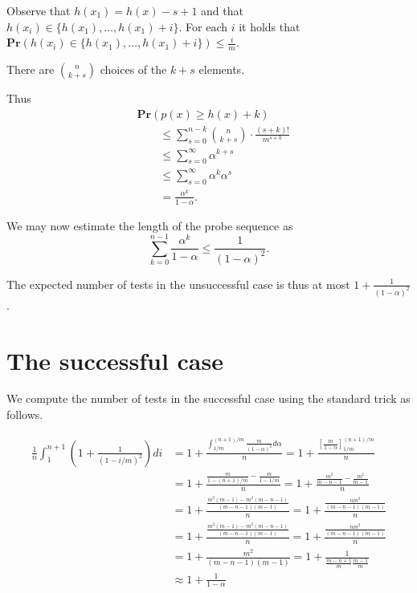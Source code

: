 \documentclass[12pt,notitlepage]{report}
\theoremstyle{definition}
\theoremstyle{plain}
\newcommand{\Prob}[1]{\mathbf{Pr}\left(#1\right)}
\begin{document}
Observe that $h(x_1) = h(x) - s + 1$ and that $h(x_i) \in \{h(x_1), \dots, h(x_1) + i\}$. For each $i$ it holds that $\Prob{h(x_i) \in \{h(x_1), \dots, h(x_1) + i\}} \leq \frac{i}{m}$.

There are ${n \choose k + s}$ choices of the $k + s$ elements.

Thus
\[
\begin{split}
& \Prob{p(x) \geq h(x) + k} \\ 
& \qquad \leq \sum_{s = 0}^{n - k} {n \choose k + s} \cdot \frac{(s + k)!}{m^{s+k}} \\
& \qquad \leq \sum_{s=0}^\infty \alpha^{k + s} \\
& \qquad \leq \sum_{s=0}^\infty \alpha^{k} \alpha^{s} \\
& \qquad = \frac{\alpha ^ k}{1 - \alpha}.
\end{split}
\]

We may now estimate the length of the probe sequence as
\[
\sum_{k = 0}^{n - 1} \frac{\alpha^k}{1-\alpha} \leq \frac{1}{(1 - \alpha)^2}.
\]

The expected number of tests in the unsuccessful case is thus at most $1 + \frac{1}{(1 - \alpha)^2}$.

\section{The successful case}

We compute the number of tests in the successful case using the standard trick as follows.

\[
\begin{split}
\frac{1}{n} \int_{1}^{n + 1} \left(1 + \frac{1}{(1 - i/m) ^ 2}\right) di & = 1 + \frac{\int_{1/m}^{(n + 1)/m} \frac{m}{(1 - \alpha)^2} d\alpha}{n} = 1 + \frac{[\frac{m}{1-\alpha}]_{1/m}^{(n+1)/m}}{n} \\
& = 1 + \frac{\frac{m}{1 - (n + 1) / m} - \frac{m}{1 - 1/m}}{n} = 1 + \frac{\frac{m^2}{m - n - 1} - \frac{m^2}{m - 1}}{n} \\
& = 1 + \frac{\frac{m^2(m - 1) - m^2(m - n - 1)}{(m - n - 1)(m - 1)}}{n} = 1 + \frac{\frac{nm^2}{(m - n - 1)(m - 1)}}{n} \\
& = 1 + \frac{\frac{m^2(m - 1) - m^2(m - n - 1)}{(m - n - 1)(m - 1)}}{n} = 1 + \frac{\frac{nm^2}{(m - n - 1)(m - 1)}}{n} \\
& = 1 + \frac{m^2}{(m - n - 1)(m - 1)} = 1 + \frac{1}{\frac{m - n + 1}{m}\frac{m-1}{m}}\\
& \approx 1 + \frac{1}{1 - \alpha}
\end{split}
\]
\end{document}
